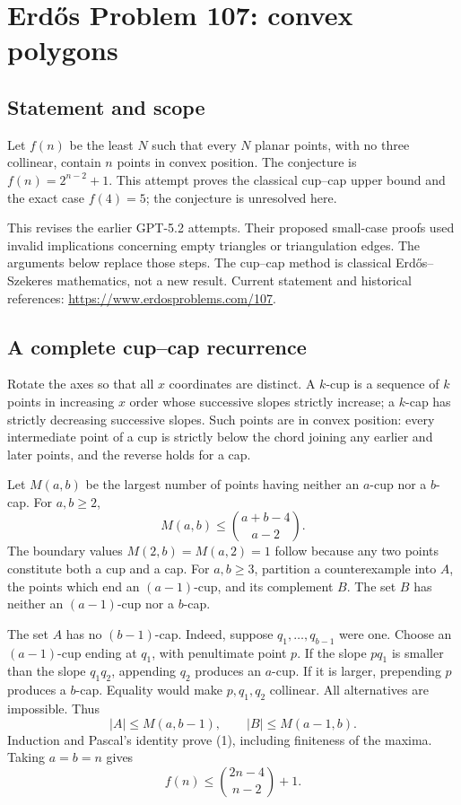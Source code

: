 \section*{Erd\H{o}s Problem 107: convex polygons}
\subsection*{Statement and scope}
Let $f(n)$ be the least $N$ such that every $N$ planar points, with no three collinear, contain $n$ points in convex position. The conjecture is $f(n)=2^{n-2}+1$. This attempt proves the classical cup--cap upper bound and the exact case $f(4)=5$; the conjecture is unresolved here.

This revises the earlier GPT-5.2 attempts. Their proposed small-case proofs used invalid implications concerning empty triangles or triangulation edges. The arguments below replace those steps. The cup--cap method is classical Erd\H{o}s--Szekeres mathematics, not a new result. Current statement and historical references: \url{https://www.erdosproblems.com/107}.

\subsection*{A complete cup--cap recurrence}
Rotate the axes so that all $x$ coordinates are distinct. A $k$-cup is a sequence of $k$ points in increasing $x$ order whose successive slopes strictly increase; a $k$-cap has strictly decreasing successive slopes. Such points are in convex position: every intermediate point of a cup is strictly below the chord joining any earlier and later points, and the reverse holds for a cap.

Let $M(a,b)$ be the largest number of points having neither an $a$-cup nor a $b$-cap. For $a,b\ge2$,
\[
 M(a,b)\le {a+b-4\choose a-2}. \tag{1}
\]
The boundary values $M(2,b)=M(a,2)=1$ follow because any two points constitute both a cup and a cap. For $a,b\ge3$, partition a counterexample into $A$, the points which end an $(a-1)$-cup, and its complement $B$. The set $B$ has neither an $(a-1)$-cup nor a $b$-cap.

The set $A$ has no $(b-1)$-cap. Indeed, suppose $q_1,\ldots,q_{b-1}$ were one. Choose an $(a-1)$-cup ending at $q_1$, with penultimate point $p$. If the slope $pq_1$ is smaller than the slope $q_1q_2$, appending $q_2$ produces an $a$-cup. If it is larger, prepending $p$ produces a $b$-cap. Equality would make $p,q_1,q_2$ collinear. All alternatives are impossible. Thus
\[
 |A|\le M(a,b-1),\qquad |B|\le M(a-1,b).
\]
Induction and Pascal's identity prove (1), including finiteness of the maxima. Taking $a=b=n$ gives
\[
 f(n)\le {2n-4\choose n-2}+1. \tag{2}
\]

